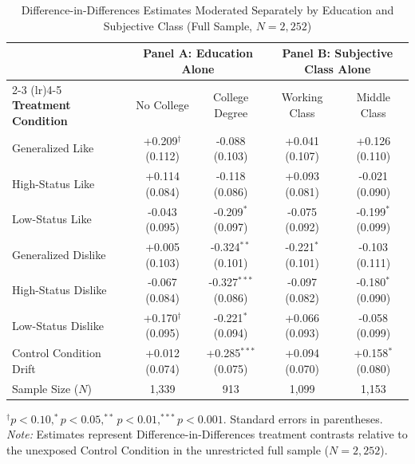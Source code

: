 \begin{table}[ht!]
\centering
\small
\caption{Difference-in-Differences Estimates Moderated Separately by Education and Subjective Class (Full Sample, $N = 2{,}252$)}
\label{tbl:did_edu_class_full}
\setlength{\tabcolsep}{2.0pt}
\begin{tabular*}{\linewidth}{@{\extracolsep{\fill}}lcccc@{}}
\toprule
& \multicolumn{2}{c}{\textbf{Panel A: Education Alone}} & \multicolumn{2}{c}{\textbf{Panel B: Subjective Class Alone}} \\
\cmidrule(lr){2-3} \cmidrule(lr){4-5}
\textbf{Treatment Condition} & No College & College Degree & Working Class & Middle Class \\
\midrule
Generalized Like & +0.209$^{\dagger}$ (0.112) & -0.088 (0.103) & +0.041 (0.107) & +0.126 (0.110) \\
High-Status Like & +0.114 (0.084) & -0.118 (0.086) & +0.093 (0.081) & -0.021 (0.090) \\
Low-Status Like & -0.043 (0.095) & -0.209$^{*}$ (0.097) & -0.075 (0.092) & -0.199$^{*}$ (0.099) \\
Generalized Dislike & +0.005 (0.103) & -0.324$^{**}$ (0.101) & -0.221$^{*}$ (0.101) & -0.103 (0.111) \\
High-Status Dislike & -0.067 (0.084) & -0.327$^{***}$ (0.086) & -0.097 (0.082) & -0.180$^{*}$ (0.090) \\
Low-Status Dislike & +0.170$^{\dagger}$ (0.095) & -0.221$^{*}$ (0.094) & +0.066 (0.093) & -0.058 (0.099) \\
\midrule
Control Condition Drift & +0.012 (0.074) & +0.285$^{***}$ (0.075) & +0.094 (0.070) & +0.158$^{*}$ (0.080) \\
Sample Size ($N$) & 1,339 & 913 & 1,099 & 1,153 \\
\bottomrule
\end{tabular*}
\begin{minipage}{\linewidth}
\vspace{4pt}
\footnotesize
$^{\dagger}p < 0.10, ^{*}p < 0.05, ^{**}p < 0.01, ^{***}p < 0.001$. Standard errors in parentheses. \newline
\textit{Note:} Estimates represent Difference-in-Differences treatment contrasts relative to the unexposed Control Condition in the unrestricted full sample ($N = 2{,}252$).
\end{minipage}
\end{table}
